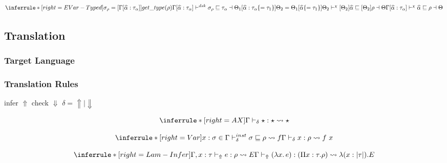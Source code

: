 
\[
\inferrule*[right=EVar-Typed]
{
\sigma_\rho = [\Gamma [\widehat \alpha:\tau_\alpha] ] get\_type(\rho)\\
\Gamma[\widehat \alpha:\tau_\alpha] \dsk \sigma_\rho \sqsubseteq \tau_\alpha \dashv \Theta_1[\widehat \alpha:\tau_\alpha\{=\tau_1\}] \\
\Theta_2 = \Theta_1[\widehat \alpha\{=\tau_1\}] \\
\Theta_2 \dskunify [\Theta_2]\widehat \alpha \sqsubseteq [\Theta_2]\rho \dashv \Theta
}
{\Gamma[\widehat \alpha:\tau_\alpha] \dskunify \widehat \alpha \sqsubseteq \rho \dashv \Theta }
\]

\clearpage


\iffalse
\subsection{Translation}

\newcommand{\transto}[1]{\leadsto#1}
\newcommand{\translated}[1]{|#1|}
\newcommand{\cyancolorbox}[1]{\colorbox{cyan!30}{$#1$}}
\newcommand{\invariant}[2]{}

\subsubsection{Target Language}

\gram{\ottE\ottinterrule}

\subsubsection{Translation Rules}

\framebox{$ \infercheck e : \rho \invariant{E}{|\rho|}$ } infer $\Uparrow$ check $\Downarrow$ $\delta = \Uparrow \mid \Downarrow$

\[
\inferrule*[right=AX]
{} {\infercheck \star : \star \transto{\star}}
\]

\[
\inferrule*[right=Var]
{x:\sigma \in \Gamma \\ \instinfercheck \sigma \sqsubseteq \rho \transto{f} } {\infercheck x : \rho \transto{f\ x}}
\]

\[
\inferrule*[right=Lam-Infer]
{\Gamma,x: \tau \infertypeno e : \rho \transto{E} }
{\infertype (\lambda x.\, e) : (\Pi x: \tau. \rho) \transto {\lambda(x:\translated{\tau}). E}}
\]

